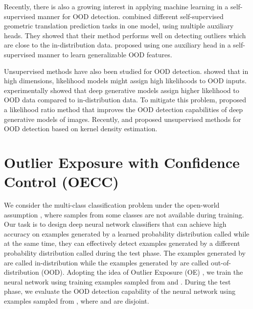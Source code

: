 \documentclass{article} \usepackage{iclr2020_conference,times}
\begin{document}
Recently, there is also a growing interest in applying machine learning in a self-supervised manner for OOD detection. \citet{hendrycks2019using} combined different self-supervised geometric translation prediction tasks in one model, using multiple auxiliary heads. They showed that their method performs well on detecting outliers which are close to the in-distribution data. \citet{mohseni2020} proposed using one auxiliary head in a self-supervised manner to learn generalizable OOD features.

Unsupervised methods have also been studied for OOD detection. \citet{choi2018waic} showed that in high dimensions, likelihood models might assign high likelihoods to OOD inputs. \citet{2018arXiv181009136N} experimentally showed that deep generative models assign higher likelihood to OOD data compared to in-distribution data. To mitigate this problem, \cite{2019arXiv190602845R} proposed a likelihood ratio method that improves the OOD detection capabilities of deep generative models of images. Recently, \cite{morningstar2020density} and \cite{erdil2020unsupervised} proposed unsupervised methods for OOD detection based on kernel density estimation.


\section{Outlier Exposure with Confidence Control (OECC)}\label{teleftaio}
We consider the multi-class classification problem under the open-world assumption \citep{Bendale_2015_CVPR}, where samples from some classes are not available during training. Our task is to design deep neural network classifiers that can achieve high accuracy on examples generated by a learned probability distribution called  while at the same time, they can effectively detect examples generated by a different probability distribution called  during the test phase. The examples generated by  are called in-distribution while the examples generated by  are called out-of-distribution (OOD). Adopting the idea of Outlier Exposure (OE) \citep{hendrycks2019oe}, we train the neural network using training examples sampled from  and . During the test phase, we evaluate the OOD detection capability of the neural network using examples sampled from , where  and  are disjoint.
\end{document}
